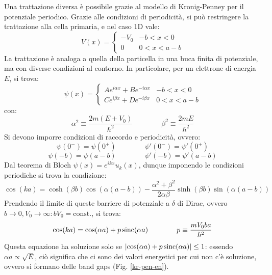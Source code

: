 Una trattazione diversa è possibile grazie al modello di Kronig-Penney per il potenziale periodico. Grazie alle condizioni di periodicità, si può restringere la trattazione alla cella primaria, e nel caso 1D vale:
\begin{equation}
	V(x) =
	\begin{cases}
		-V_0 & -b < x < 0 \\
		0 & 0 < x < a-b
	\end{cases}
\end{equation}
La trattazione è analoga a quella della particella in una buca finita di potenziale, ma con diverse condizioni al contorno. In particolare, per un elettrone di energia $ E $, si trova:
\begin{equation}
	\psi(x) =
	\begin{cases}
		A e^{i \alpha x} + B e^{-i \alpha x} & -b < x < 0 \\
		C e^{i \beta x} + D e^{-i \beta x} & 0 < x < a-b
	\end{cases}
\end{equation}
con:
\begin{equation}
	\alpha^2 \equiv \frac{2m (E + V_0)}{\hbar^2}
	\qquad \qquad
	\beta^2 \equiv \frac{2m E}{\hbar^2}
\end{equation}
Si devono imporre condizioni di raccordo e periodicità, ovvero:
\begin{equation}
	\psi(0^-) = \psi(0^+)
	\qquad \qquad
	\psi'(0^-) = \psi'(0^+)
\end{equation}
\begin{equation}
	\psi(-b) = \psi(a-b)
	\qquad \qquad
	\psi'(-b) = \psi'(a-b)
\end{equation}
Dal teorema di Bloch $ \psi(x) = e^{ikx} u_k(x) $, dunque imponendo le condizioni periodiche si trova la condizione:
\begin{equation}
	\cos (ka) = \cosh(\beta b) \cos (\alpha(a-b)) - \frac{\alpha^2 + \beta^2}{2\alpha \beta} \sinh(\beta b) \sin(\alpha (a-b))
\end{equation}
Prendendo il limite di queste barriere di potenziale a $ \delta $ di Dirac, ovvero $ b \rightarrow 0 , V_0 \rightarrow \infty : bV_0 = \text{const.} $, si trova:
\begin{equation}
	\cos(ka) = \cos(\alpha a) + p \operatorname{sinc}(\alpha a)
	\qquad \qquad
	p \equiv \frac{m V_0 ba}{\hbar^2}
\end{equation}
Questa equazione ha soluzione solo se $ \left\lvert\cos(\alpha a) + p \operatorname{sinc}(\alpha a)\right\rvert \le 1 $: essendo $ \alpha a \propto \sqrt{E} $, ciò significa che ci sono dei valori energetici per cui non c'è soluzione, ovvero si formano delle band gaps (Fig. \ref{kr-pen-en}).

